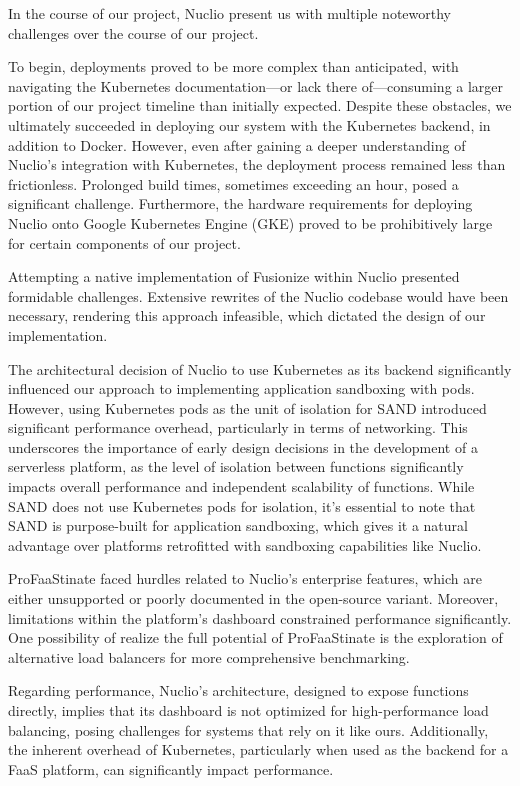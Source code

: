 In the course of our project, Nuclio present us with multiple noteworthy challenges over the course of our project.

To begin, deployments proved to be more complex than anticipated, with navigating the Kubernetes documentation—or lack there of—consuming a larger portion of our project timeline than initially expected.
Despite these obstacles, we ultimately succeeded in deploying our system with the Kubernetes backend, in addition to Docker. 
However, even after gaining a deeper understanding of Nuclio's integration with Kubernetes, the deployment process remained less than frictionless.
Prolonged build times, sometimes exceeding an hour, posed a significant challenge.
Furthermore, the hardware requirements for deploying Nuclio onto Google Kubernetes Engine (GKE) proved to be prohibitively large for certain components of our project.

Attempting a native implementation of Fusionize within Nuclio presented formidable challenges.
Extensive rewrites of the Nuclio codebase would have been necessary, rendering this approach infeasible, which dictated the design of our implementation.

The architectural decision of Nuclio to use Kubernetes as its backend significantly influenced our approach to implementing application sandboxing with pods.
However, using Kubernetes pods as the unit of isolation for SAND introduced significant performance overhead, particularly in terms of networking.
This underscores the importance of early design decisions in the development of a serverless platform, as the level of isolation between functions significantly impacts overall performance and independent scalability of functions.
While SAND does not use Kubernetes pods for isolation, it's essential to note that SAND is purpose-built for application sandboxing, which gives it a natural advantage over platforms retrofitted with sandboxing capabilities like Nuclio.

ProFaaStinate faced hurdles related to Nuclio's enterprise features, which are either unsupported or poorly documented in the open-source variant.
Moreover, limitations within the platform's dashboard constrained performance significantly. 
One possibility of realize the full potential of ProFaaStinate is the exploration of alternative load balancers for more comprehensive benchmarking.

Regarding performance, Nuclio's architecture, designed to expose functions directly, implies that its dashboard is not optimized for high-performance load balancing, posing challenges for systems that rely on it like ours.
Additionally, the inherent overhead of Kubernetes, particularly when used as the backend for a FaaS platform, can significantly impact performance.

